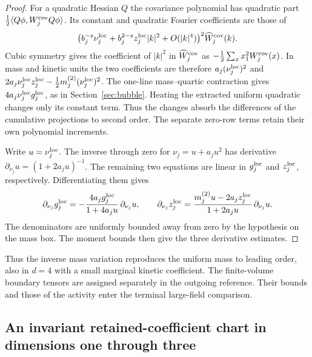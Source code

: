 \documentclass[11pt]{article}
\theoremstyle{definition}
\begin{document}
\begin{proof}
For a quadratic Hessian \(Q\) the covariance polynomial has quadratic
part \(\tfrac12\langle Q\phi,W_j^{\rm cov}Q\phi\rangle\).
Its constant and quadratic Fourier coefficients are those of
\begin{equation}
 \bigl(b_j^{-s}\nu_j^{\rm loc}
       +b_j^{2-s} z_j^{\rm loc}|k|^2+O(|k|^4)\bigr)^2
                \widehat W_j^{\rm cov}(k).
\end{equation}
Cubic symmetry gives the coefficient of \(|k|^2\) in
\(\widehat W_j^{\rm cov}\) as
\(-\tfrac12\sum_x x_1^2 W_j^{\rm cov}(x)\).
In mass and kinetic units the two coefficients are therefore
\(a_j(\nu_j^{\rm loc})^2\) and
\(2a_j\nu_j^{\rm loc}z_j^{\rm loc}
-\tfrac12m_j^{(2)}(\nu_j^{\rm loc})^2\).
The one-line mass--quartic contraction gives
\(4a_j\nu_j^{\rm loc}g_j^{\rm loc}\), as in
Section~\ref{sec:bubble}. Heating the extracted uniform quadratic
changes only its constant term. Thus the changes absorb the
differences of the cumulative projections to second order.
The separate zero-row terms retain their own polynomial increments.

Write \(u=\nu_j^{\rm loc}\). The inverse through zero for
\(\nu_j=u+a_j u^2\) has derivative
\(\partial_{\nu_j}u=(1+2a_j u)^{-1}\).
The remaining two equations are linear in \(g_j^{\rm loc}\)
and \(z_j^{\rm loc}\), respectively. Differentiating them gives
\begin{equation}
 \partial_{\nu_j}g_j^{\rm loc}
   =-\frac{4a_jg_j^{\rm loc}}{1+4a_j u}\,\partial_{\nu_j}u,\qquad
 \partial_{\nu_j}z_j^{\rm loc}
   =\frac{m_j^{(2)}u-2a_jz_j^{\rm loc}}{1+2a_j u}\,
      \partial_{\nu_j}u .
\end{equation}
The denominators are uniformly bounded away from zero by the
hypothesis on the mass box. The moment bounds then give the three
derivative estimates.
\end{proof}

Thus the inverse mass variation reproduces the uniform mass to
leading order, also in \(d=4\) with a small marginal kinetic
coefficient. The finite-volume boundary tensors are assigned
separately in the outgoing reference. Their bounds and those of
the activity enter the terminal large-field comparison.

\subsection{An invariant retained-coefficient chart in dimensions one through three}
\label{sec:cube-retained-chart}
\end{document}
